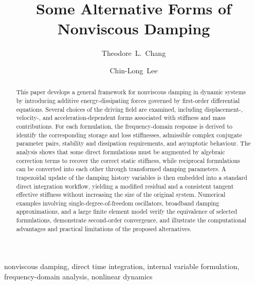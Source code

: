 \documentclass[3p,11pt,fleqn,review,sort&compress]{elsarticle}
\begin{document}
\linenumbers
\begin{abstract}
\begin{linenumbers}
This paper develops a general framework for nonviscous damping in dynamic systems by introducing additive energy-dissipating forces governed by first-order differential equations.
Several choices of the driving field are examined, including displacement-, velocity-, and acceleration-dependent forms associated with stiffness and mass contributions.
For each formulation, the frequency-domain response is derived to identify the corresponding storage and loss stiffnesses, admissible complex conjugate parameter pairs, stability and dissipation requirements, and asymptotic behaviour.
The analysis shows that some direct formulations must be augmented by algebraic correction terms to recover the correct static stiffness, while reciprocal formulations can be converted into each other through transformed damping parameters.
A trapezoidal update of the damping history variables is then embedded into a standard direct integration workflow, yielding a modified residual and a consistent tangent effective stiffness without increasing the size of the original system.
Numerical examples involving single-degree-of-freedom oscillators, broadband damping approximations, and a large finite element model verify the equivalence of selected formulations, demonstrate second-order convergence, and illustrate the computational advantages and practical limitations of the proposed alternatives.
\end{linenumbers}
\end{abstract}
\begin{keyword}
nonviscous damping\sep
direct time integration\sep
internal variable formulation\sep
frequency-domain analysis\sep
nonlinear dynamics
\end{keyword}
\begin{frontmatter}
\title{Some Alternative Forms of Nonviscous Damping}
\author[add1]{Theodore~L.~Chang}
\author[add2]{Chin-Long~Lee}
\address[add1]{IRIS Adlershof, Humboldt-Universität zu Berlin, Berlin, Germany, 12489.}
\address[add2]{Department of Civil and Environmental Engineering, University of Canterbury, Christchurch, New Zealand, 8041.}
\end{frontmatter}





\appendix

% 

\end{document}
